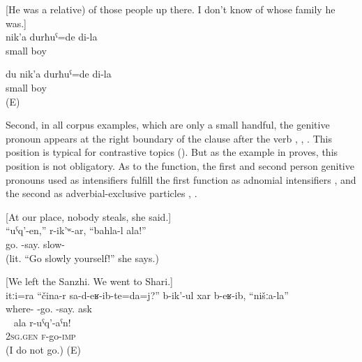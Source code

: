 \begin{exe}
	\ex	\label{ex:ex:I was a little boy@BREFLIST}
	\begin{xlist}
	\ex	\label{ex:I was a little boy@BREFL} [He was a relative) of those people up there. I don't know of whose family he was.] \\
	\gll	nik'a	durħuˁ=de	di-la\\
		small	boy	\\
	\glt	{}
	
		\ex	\label{ex:I was a little boy@BREFL2} 
	 du nik'a	durħuˁ=de	di-la\\
		{}  small	boy	\\
	\glt	 {} (E)
		\end{xlist}
\end{exe}

Second, in all corpus examples, which are only a small handful, the genitive pronoun appears at the right boundary of the clause after the verb , , . This position is typical for contrastive topics (). But as the example in  proves, this position is not obligatory. As to the function, the first and second person genitive pronouns used as intensifiers fulfill the first function as adnomial intensifiers ,  and the second as adverbial-exclusive particles , .

\begin{exe}
		\ex	\label{You can leave on your own, she says, without worries.} [‎‎At our place, nobody steals, she said.]\\
		\gll	``uˁq'-en,''	r-ik'ʷ-ar,	``bahla-l	ala!''\\
			go.	-say.	slow-	 \\
		\glt	{} (lit. ``Go slowly yourself!'' she says.)
		
			\ex	\label{They asked us, where did you come from?} [We left the Sanzhi. We went to Shari.]\\
		\gll	itːi=ra	``čina-r	sa-d-eʁ-ib-te=da=j?''	b-ik'-ul	xar	b-eʁ-ib,	``nišːa-la''\\
				where-	-go.	-say.	ask		\\
		\glt	{} 
\
			\ex	\label{ex:(You) yourself go awayREFL}
		\gll	ala	r-uˁq'-aˁn!\\
			2\textsc{sg}.\textsc{gen}	\textsc{f}-go-\textsc{imp}\\
		\glt	{} (I do not go.) (E)
\end{exe}


